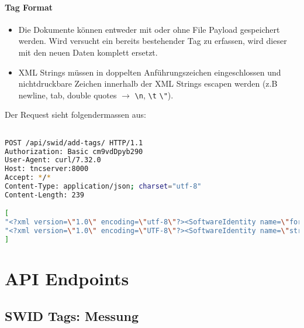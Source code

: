 \documentclass[10pt,a4paper]{scrartcl}
\newcommand*{\escape}[1]{\texttt{\textbackslash#1}}
\begin{document}
\paragraph{Tag Format}
\begin{itemize}
\item Die Dokumente können entweder mit oder ohne File Payload gespeichert werden. Wird versucht ein bereits bestehender Tag zu erfassen, wird dieser mit den neuen Daten komplett ersetzt.
\item XML Strings müssen in doppelten Anführungszeichen eingeschlossen und nichtdruckbare Zeichen innerhalb der XML Strings escapen werden (z.B newline, tab, double quotes $\rightarrow$ \escape{n}, \escape{t} \escape{"}).

\end{itemize}

Der Request sieht folgendermassen aus:
\begin{lstlisting}[language=BASH]

POST /api/swid/add-tags/ HTTP/1.1
Authorization: Basic cm9vdDpyb290
User-Agent: curl/7.32.0
Host: tncserver:8000
Accept: */*
Content-Type: application/json; charset="utf-8"
Content-Length: 239

[
"<?xml version=\"1.0\" encoding=\"utf-8\"?><SoftwareIdentity name=\"fortune-mod\"...",
"<?xml version=\"1.0\" encoding=\"UTF-8\"?><SoftwareIdentity name=\"strongswan\"..."
]
\end{lstlisting}

\section{API Endpoints}

\subsection{SWID Tags: Messung}
\label{api:measurement}
\end{document}
